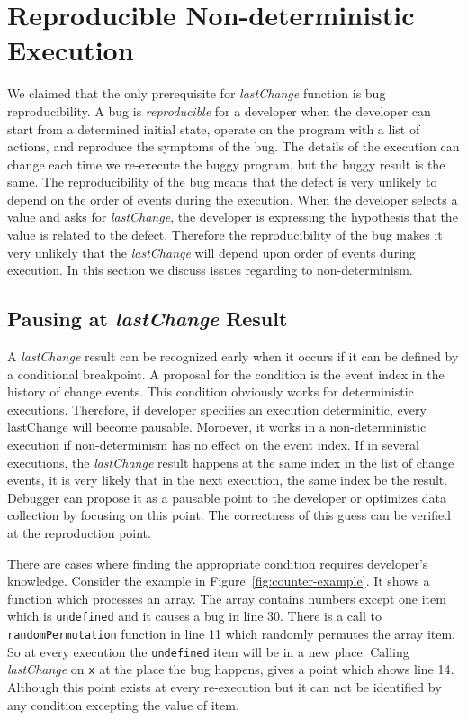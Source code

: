 \documentclass[runningheads,a4paper]{llncs}
\begin{document}

\section{Reproducible Non-deterministic Execution}
We claimed that the only prerequisite for \textit{lastChange} function is bug
reproducibility. A bug is \textit{reproducible} for a developer when the developer can
start from a determined initial state, operate on the program with a
list of actions, and reproduce the symptoms of the bug. The details of
the execution can change each time we re-execute the buggy program,
but the buggy result is the same.  The reproducibility of the bug
means that the defect is very unlikely to depend on the order of
events during the execution. When the developer selects a value and
asks for \textit{lastChange}, the developer is expressing the hypothesis that
the value is related to the defect. Therefore the reproducibility of
the bug makes it very unlikely that the \textit{lastChange} will
depend upon order of events during execution. In this section we discuss issues regarding to non-determinism.

\subsection{Pausing at \textit{lastChange} Result}
A \textit{lastChange} result can be recognized early when it occurs if it can
be defined by a conditional breakpoint. A proposal for the condition is the event index
in the history of change events. This condition obviously works for deterministic 
executions. Therefore, if developer specifies an execution determinitic, every lastChange
will become pausable. Moroever, it works in a non-deterministic execution if non-determinism
has no effect on the event index. If in several executions, the \textit{lastChange} result happens at
the same index in the list of change events, it is very likely that in the next execution, the 
same index be the result. Debugger can propose it as a pausable point to the developer or optimizes data
collection by focusing on this point. The correctness of this guess can be verified at the reproduction
point.

There are cases where finding the appropriate condition requires developer's knowledge.
Consider the example in Figure~\ref{fig:counter-example}. It shows a function which processes an
array. The array contains numbers except one item which is
\texttt{undefined} and it causes a bug in line 30. There is a call to
\texttt{randomPermutation} function in line 11 which randomly
permutes the array item. So at every execution the
\texttt{undefined} item will be in a new place. Calling
\textit{lastChange} on \texttt{x} at the place the bug happens, gives a
point which shows line 14. Although this point exists at every
re-execution but it can not be identified by any condition excepting
the value of item.
\end{document}
